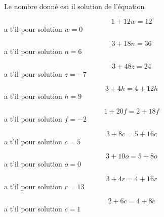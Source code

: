  Le nombre donné est il solution de l'équation

\begin{multicols}{3}


$$1+12w=12$$ a t'il pour solution $w=0$



$$3+18n=36$$ a t'il pour solution $n=6$



$$3+48z=24$$ a t'il pour solution $z=-7$
\columnbreak



$$3+4h=4+12h$$ a t'il pour solution $h=9$



$$1+20f=2+18f$$ a t'il pour solution $f=-2$



$$3+8c=5+16c$$ a t'il pour solution $c=5$



$$3+10o=5+8o$$ a t'il pour solution $o=0$



$$3+4r=4+16r$$ a t'il pour solution $r=13$



$$2+6c=4+8c$$ a t'il pour solution $c=1$

\end{multicols}